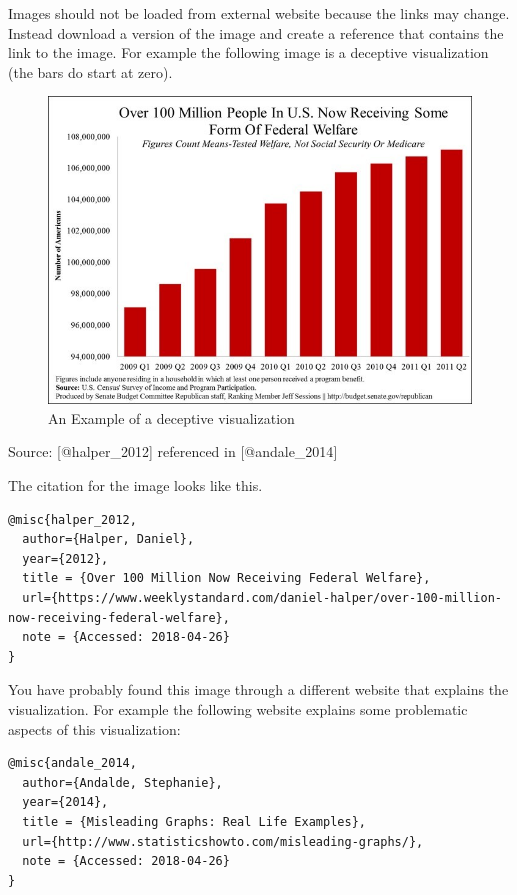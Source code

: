 \documentclass[]{book}
\theoremstyle{definition}
\theoremstyle{definition}
\theoremstyle{definition}
\theoremstyle{remark}
\begin{document}
Images should not be loaded from external website because the links may
change. Instead download a version of the image and create a reference
that contains the link to the image. For example the following image is
a deceptive visualization (the bars do start at zero).

\begin{figure}
\centering
\includegraphics{images/halper_welfare.jpg}
\caption{An Example of a deceptive visualization}
\end{figure}

Source: {[}@halper\_2012{]} referenced in {[}@andale\_2014{]}

The citation for the image looks like this.

\begin{verbatim}
@misc{halper_2012,
  author={Halper, Daniel},
  year={2012},
  title = {Over 100 Million Now Receiving Federal Welfare},
  url={https://www.weeklystandard.com/daniel-halper/over-100-million-now-receiving-federal-welfare},
  note = {Accessed: 2018-04-26}
}
\end{verbatim}

You have probably found this image through a different website that
explains the visualization. For example the following website explains
some problematic aspects of this visualization:

\begin{verbatim}
@misc{andale_2014,
  author={Andalde, Stephanie},
  year={2014},
  title = {Misleading Graphs: Real Life Examples},
  url={http://www.statisticshowto.com/misleading-graphs/},
  note = {Accessed: 2018-04-26}
}
\end{verbatim}
\end{document}
